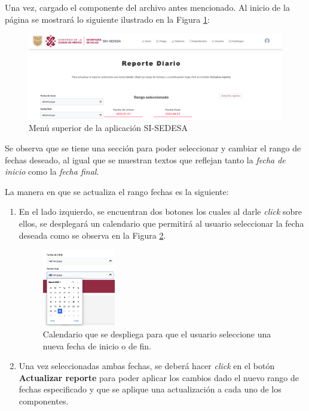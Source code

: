 Una vez, cargado el componente del archivo antes mencionado. Al inicio de la página se mostrará lo siguiente ilustrado en la Figura \ref{fig:calendario_menu}:

\begin{figure}[h!]
    \centering
    \includegraphics[width=\textwidth]{images/uso1.png}
    \caption{Menú superior de la aplicación SI-SEDESA}
    \label{fig:calendario_menu}
\end{figure}

Se observa que se tiene una sección para poder seleccionar y cambiar el rango de fechas deseado, al igual que se muestran textos que reflejan tanto la \textit{fecha de inicio} como la \textit{fecha final}.

La manera en que se actualiza el rango fechas es la siguiente:

\begin{enumerate}
    \item En el lado izquierdo, se encuentran dos botones los cuales al darle \textit{click} sobre ellos, se desplegará un calendario que permitirá al usuario seleccionar la fecha deseada como se observa en la Figura \ref{fig:calendario_desplegable}.

    \begin{figure}[ht!]
        \centering
        \includegraphics[width=0.3\textwidth]{images/uso3.png}
        \caption{Calendario que se despliega para que el usuario seleccione una nueva fecha de inicio o de fin.}
        \label{fig:calendario_desplegable}
    \end{figure}

    \item Una vez seleccionadas ambas fechas, se deberá hacer \textit{click} en el botón \textbf{Actualizar reporte} para poder aplicar los cambios dado el nuevo rango de fechas especificado y que se aplique una actualización a cada uno de los componentes.
\end{enumerate}


